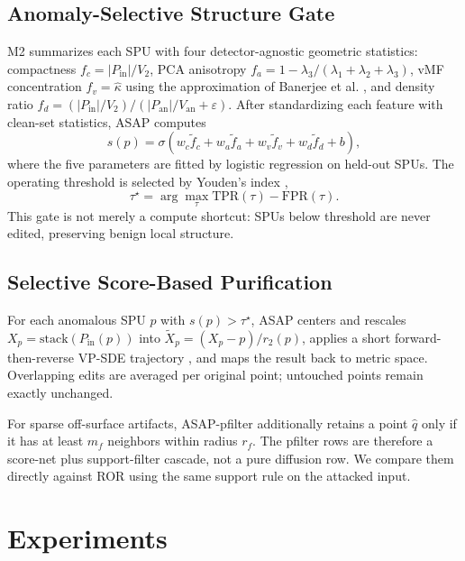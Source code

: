 \documentclass[conference]{IEEEtran}
\begin{document}
\subsection{Anomaly-Selective Structure Gate}

M2 summarizes each SPU with four detector-agnostic geometric statistics: compactness $f_c=|P_{\mathrm{in}}|/V_2$, PCA anisotropy $f_a=1-\lambda_3/(\lambda_1+\lambda_2+\lambda_3)$, vMF concentration $f_v=\hat{\kappa}$ using the approximation of Banerjee et al. \cite{banerjee2005clustering}, and density ratio $f_d=(|P_{\mathrm{in}}|/V_2)/(|P_{\mathrm{an}}|/V_{\mathrm{an}}+\varepsilon)$. After standardizing each feature with clean-set statistics, ASAP computes
\begin{equation}
s(p)=\sigma\!\left(w_c\tilde f_c+w_a\tilde f_a+w_v\tilde f_v+w_d\tilde f_d+b\right),
\end{equation}
where the five parameters are fitted by logistic regression on held-out SPUs. The operating threshold is selected by Youden's index \cite{youden1950index},
\begin{equation}
\tau^\star=\arg\max_\tau \mathrm{TPR}(\tau)-\mathrm{FPR}(\tau).
\end{equation}
This gate is not merely a compute shortcut: SPUs below threshold are never edited, preserving benign local structure.

\subsection{Selective Score-Based Purification}

For each anomalous SPU $p$ with $s(p)>\tau^\star$, ASAP centers and rescales $X_p=\mathrm{stack}(P_{\mathrm{in}}(p))$ into $\tilde X_p=(X_p-p)/r_2(p)$, applies a short forward-then-reverse VP-SDE trajectory \cite{song2021scorebased}, and maps the result back to metric space. Overlapping edits are averaged per original point; untouched points remain exactly unchanged.

For sparse off-surface artifacts, ASAP-pfilter additionally retains a point $\hat q$ only if it has at least $m_f$ neighbors within radius $r_f$. The pfilter rows are therefore a score-net plus support-filter cascade, not a pure diffusion row. We compare them directly against ROR using the same support rule on the attacked input.

\section{Experiments}
\end{document}
